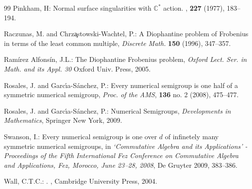 \documentclass[oneside]{amsart}
\numberwithin{equation}{section}
\numberwithin{equation}{subsection}
\theoremstyle{plain}
\theoremstyle{definition}
\begin{document}
\begin{thebibliography}{99}
Pinkham, H:
\newblock Normal surface singularities with $\mathbb{C}^*$ action.
, {\bf 227} (1977), 183--194.

Raczunas, M. and Chrz\c astowski-Wachtel, P.: A Diophantine problem of Frobenius in terms of the least common multiple,
{\em Discrete Math.} {\bf 150} (1996), 347--357. 

 Ram\'irez Alfons\'in, J.L.: The Diophantine Frobenius problem, {\em Oxford Lect. Ser. in Math. and its Appl. 30} Oxford Univ. Press, 2005.

Rosales, J. and Garc{\'\i}a-S{\'a}nchez, P.: Every numerical semigroup is one half of a symmetric numerical semigroup, {\em  Proc. of the AMS}, {\bf 136} no. 2 (2008), 475--477.

Rosales, J. and Garc{\'\i}a-S{\'a}nchez, P.: Numerical Semigroups, {\em  Developments in Mathematics}, Springer New York, 2009.


Swanson, I.: Every numerical semigroup is one over $d$ of infinetely many symmetric numerical semigroups, in {\em  `Commutative Algebra and its Applications' - Proceedings of the Fifth International Fez Conference on Commutative Algebra and Applications, Fez, Morocco, June 23–28, 2008}, De Gruyter 2009, 383--386.

Wall, C.T.C.:
.
, Cambridge University
  Press, 2004.


\end{thebibliography}
\end{document}
